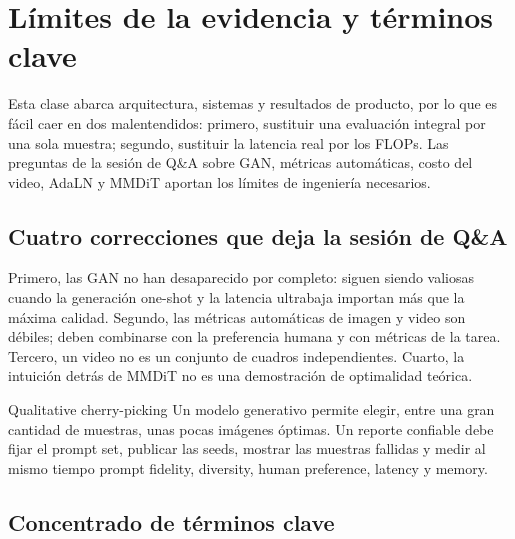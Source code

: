 \section{Límites de la evidencia y términos clave}

Esta clase abarca arquitectura, sistemas y resultados de producto, por lo que es fácil caer en dos malentendidos: primero, sustituir una evaluación integral por una sola muestra; segundo, sustituir la latencia real por los FLOPs. Las preguntas de la sesión de Q\&A sobre GAN, métricas automáticas, costo del video, AdaLN y MMDiT aportan los límites de ingeniería necesarios.

\subsection{Cuatro correcciones que deja la sesión de Q\&A}

Primero, las GAN no han desaparecido por completo: siguen siendo valiosas cuando la generación one-shot y la latencia ultrabaja importan más que la máxima calidad. Segundo, las métricas automáticas de imagen y video son débiles; deben combinarse con la preferencia humana y con métricas de la tarea. Tercero, un video no es un conjunto de cuadros independientes. Cuarto, la intuición detrás de MMDiT no es una demostración de optimalidad teórica.



\begin{warningbox}{Qualitative cherry-picking}
Un modelo generativo permite elegir, entre una gran cantidad de muestras, unas pocas imágenes óptimas. Un reporte confiable debe fijar el prompt set, publicar las seeds, mostrar las muestras fallidas y medir al mismo tiempo prompt fidelity, diversity, human preference, latency y memory.
\end{warningbox}

\subsection{Concentrado de términos clave}

